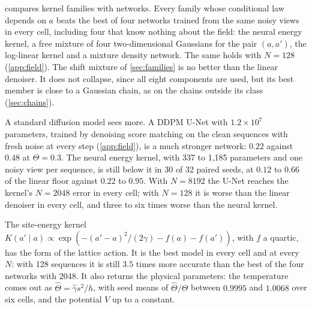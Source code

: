  compares kernel families with networks. Every family whose conditional law depends on $a$ beats the
best of four networks trained from the same noisy views in every cell, including four that know nothing about the
field: the neural energy kernel, a free mixture of four two-dimensional Gaussians for the pair $(a,a')$, the log-linear
kernel and a mixture density network. The same holds with $N=128$ (\cref{app:field}). The shift mixture of
\cref{sec:families} is no better than the linear denoiser. It does not collapse, since all eight components are used,
but its best member is close to a Gaussian chain, as on the chains outside its class (\cref{sec:chains}).

A standard diffusion model sees more. A DDPM U-Net with $1.2\times10^{7}$ parameters, trained by denoising score
matching on the clean sequences with fresh noise at every step (\cref{app:field}), is a much stronger network: $0.22$
against $0.48$ at $\Theta=0.3$. The neural energy kernel, with 337 to 1{,}185 parameters and one noisy view per sequence,
is still below it in 30 of 32 paired seeds, at $0.12$ to $0.66$ of the linear floor against $0.22$ to $0.95$. With
$N=8192$ the U-Net reaches the kernel's $N=2048$ error in every cell; with $N=128$ it is worse than the linear denoiser
in every cell, and three to six times worse than the neural kernel.

The site-energy kernel $K(a'\mid a)\propto\exp(-(a'-a)^2/(2\gamma)-f(a)-f(a'))$, with $f$ a quartic, has the form of
the lattice action. It is the best model in every cell and at every $N$: with 128 sequences it is still $3.5$ times more
accurate than the best of the four networks with 2048. It also returns the physical parameters: the temperature comes
out as $\hat\Theta=\hat\gamma s^2/h$, with seed means of $\hat\Theta/\Theta$ between $0.9995$ and $1.0068$ over six
cells, and the potential $V$ up to a constant.

